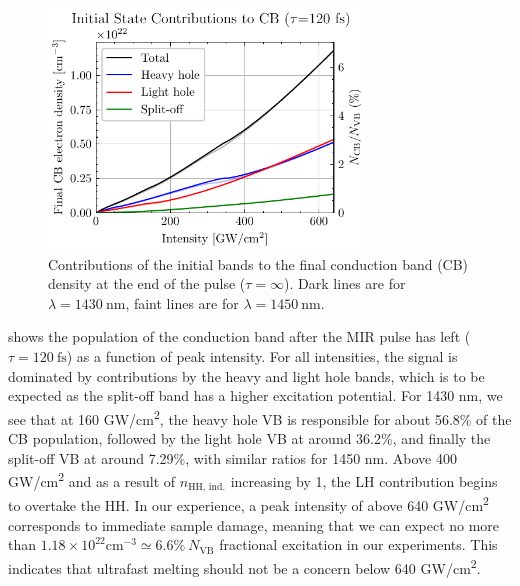 \begin{figure}
	\centering
	\includegraphics[width=0.75\textwidth]{figures/chap4/CB_dens_vs_Int.pdf}
	\caption{Contributions of the initial bands to the final conduction band (CB) density at the end of the pulse ($\tau = \infty$). Dark lines are for $\lambda = 1430 \ \textrm{nm}$, faint lines are for $\lambda = 1450 \ \textrm{nm}$.}
	\label{fig:CB_dens_vs_Int}
\end{figure}

 shows the population of the conduction band after the MIR pulse has left (${\tau = 120 \ \textrm{fs}}$) as a function of peak intensity. For all intensities, the signal is dominated by contributions by the heavy and light hole bands, which is to be expected as the split-off band has a higher excitation potential. For 1430 nm, we see that at 160 GW/cm\textsuperscript{2}, the heavy hole VB is responsible for about 56.8\% of the CB population, followed by the light hole VB at around 36.2\%, and finally the split-off VB at around 7.29\%, with similar ratios for 1450 nm. Above 400 GW/cm\textsuperscript{2} and as a result of $n_{\textrm{HH, ind.}}$ increasing by 1, the LH contribution begins to overtake the HH. In our experience, a peak intensity of above 640 GW/cm\textsuperscript{2} corresponds to immediate sample damage, meaning that we can expect no more than $1.18 \times 10^{22} \textrm{cm}^{-3} \simeq 6.6\% \ N_{\textrm{VB}}$ fractional excitation in our experiments. This indicates that ultrafast melting should not be a concern below 640 GW/cm\textsuperscript{2}.

